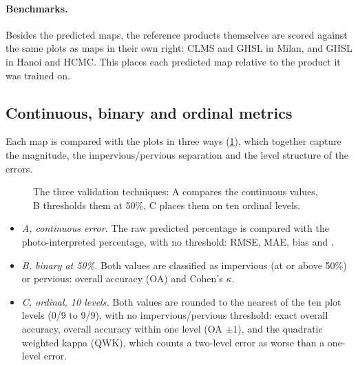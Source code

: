 \paragraph{Benchmarks.} Besides the predicted maps, the reference products
themselves are scored against the same plots as maps in their own right:
CLMS and GHSL in Milan, and GHSL in Hanoi and HCMC. This places each
predicted map relative to the product it was trained on.

\subsection{Continuous, binary and ordinal metrics}
\label{sec:metrics}

Each map is compared with the plots in three ways (\cref{fig:techniques}),
which together capture the magnitude, the impervious/pervious separation
and the level structure of the errors.

\begin{figure}[htbp]
  \centering
  \caption{The three validation techniques: A compares the continuous
  values, B thresholds them at 50\%, C places them on ten ordinal levels.}
  \label{fig:techniques}
\end{figure}

\begin{itemize}
  \item \emph{A, continuous error.} The raw predicted percentage is compared
  with the photo-interpreted percentage, with no threshold: RMSE, MAE, bias
  and \Rsq.
  \item \emph{B, binary at 50\%.} Both values are classified as impervious
  (at or above 50\%) or pervious: overall accuracy (OA) and Cohen's $\kappa$.
  \item \emph{C, ordinal, 10 levels.} Both values are rounded to the nearest
  of the ten plot levels (0/9 to 9/9), with no impervious/pervious threshold:
  exact overall accuracy, overall accuracy within one level (OA $\pm$1), and
  the quadratic weighted kappa (QWK), which counts a two-level error as worse
  than a one-level error.
\end{itemize}


